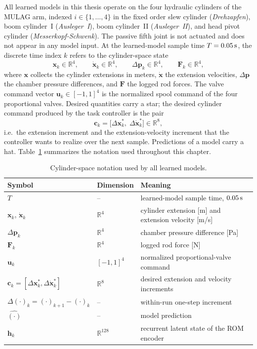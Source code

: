 All learned models in this thesis operate on the four hydraulic cylinders of
the MULAG arm, indexed $i \in \{1,\dots,4\}$ in the fixed order slew cylinder
(\emph{Drehzapfen}), boom cylinder~I (\emph{Ausleger~I}), boom cylinder~II
(\emph{Ausleger~II}), and head pivot cylinder (\emph{Messerkopf-Schwenk}).
The passive fifth joint is not actuated and does not appear in any model
input. At the learned-model sample time $T = \unit[0.05]{s}$, the discrete
time index $k$ refers to the cylinder-space state
%
\begin{equation}
  \label{eq:models:state}
  \bm{x}_k \in \mathbb{R}^4, \qquad
  \dot{\bm{x}}_k \in \mathbb{R}^4, \qquad
  \Delta\bm{p}_k \in \mathbb{R}^4, \qquad
  \bm{F}_k \in \mathbb{R}^4,
\end{equation}
%
where $\bm{x}$ collects the cylinder extensions in meters, $\dot{\bm{x}}$ the
extension velocities, $\Delta\bm{p}$ the chamber pressure differences, and
$\bm{F}$ the logged rod forces. The valve command vector
$\bm{u}_k \in [-1,1]^4$ is the normalized spool command of the four
proportional valves. Desired quantities carry a star; the desired cylinder
command produced by the task controller is the pair
%
\begin{equation}
  \label{eq:models:command}
  \bm{c}_k = \bigl[\Delta\bm{x}^{*}_k,\; \Delta\dot{\bm{x}}^{*}_k\bigr]
  \in \mathbb{R}^{8},
\end{equation}
%
i.e.\ the extension increment and the extension-velocity increment that the
controller wants to realize over the next sample. Predictions of a model
carry a hat. Table~\ref{tab:models:notation} summarizes the notation used
throughout this chapter.

\begin{table}[tb]
  \centering
  \caption{Cylinder-space notation used by all learned models.}
  \label{tab:models:notation}
  \begin{tabular}{llp{7.6cm}}
    \toprule
    Symbol & Dimension & Meaning \\
    \midrule
    $T$ & -- & learned-model sample time, $\unit[0.05]{s}$ \\
    $\bm{x}_k$, $\dot{\bm{x}}_k$ & $\mathbb{R}^4$ & cylinder extension [m] and extension velocity [m/s] \\
    $\Delta\bm{p}_k$ & $\mathbb{R}^4$ & chamber pressure difference [Pa] \\
    $\bm{F}_k$ & $\mathbb{R}^4$ & logged rod force [N] \\
    $\bm{u}_k$ & $[-1,1]^4$ & normalized proportional-valve command \\
    $\bm{c}_k = [\Delta\bm{x}^*_k, \Delta\dot{\bm{x}}^*_k]$ & $\mathbb{R}^8$ & desired extension and velocity increments \\
    $\Delta(\cdot)_k = (\cdot)_{k+1} - (\cdot)_k$ & -- & within-run one-step increment \\
    $\hat{(\cdot)}$ & -- & model prediction \\
    $\bm{h}_k$ & $\mathbb{R}^{128}$ & recurrent latent state of the ROM encoder \\
    \bottomrule
  \end{tabular}
\end{table}

